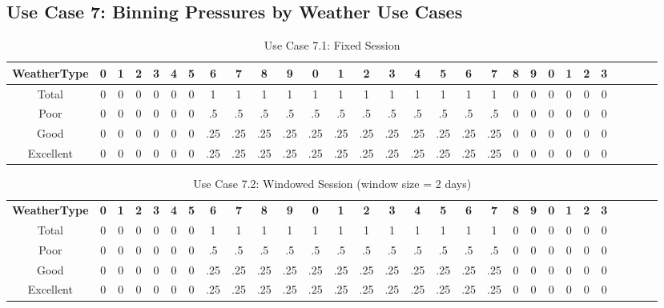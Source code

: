 \documentclass{article}
\begin{document}
\subsection{Use Case 7: Binning Pressures by Weather Use Cases}

\begin{table}
{\tiny
\caption{Use Case 7.1: Fixed Session\label{tab:time}}
\begin{tabular*}{1.05\textwidth}{@{\extracolsep{\fill}}ccccccccccccccccccccccccccccc}
\hline \hline
{\bf WeatherType} & {\bf 0} & {\bf 1} & {\bf 2} & {\bf 3} & {\bf 4} & {\bf 5} & {\bf 6} & {\bf 7} & {\bf 8} & {\bf 9} & {\bf 0} & {\bf 1} & {\bf 2} & {\bf 3} & {\bf 4} & {\bf 5} & {\bf 6} & {\bf 7} & {\bf 8} & {\bf 9} & {\bf 0} & {\bf 1} & {\bf 2} & {\bf 3}\\
\hline
Total & 0 & 0 & 0 & 0 & 0 & 0 & 1 & 1 & 1 & 1 & 1 & 1 & 1 & 1 & 1 & 1 & 1 & 1 & 0 & 0 & 0 & 0 & 0 & 0\\
Poor & 0 & 0 & 0 & 0 & 0 & 0 & .5 & .5 & .5 & .5 & .5 & .5 & .5 & .5 & .5 & .5 & .5 & .5 & 0 & 0 & 0 & 0 & 0 & 0\\
Good & 0 & 0 & 0 & 0 & 0 & 0 & .25 & .25 & .25 & .25 & .25 & .25 & .25 & .25 & .25 & .25 & .25 & .25 & 0 & 0 & 0 & 0 & 0 & 0\\
Excellent & 0 & 0 & 0 & 0 & 0 & 0 & .25 & .25 & .25 & .25 & .25 & .25 & .25 & .25 & .25 & .25 & .25 & .25 & 0 & 0 & 0 & 0 & 0 & 0\\
\hline \hline
\end{tabular*}
}
\end{table}


\begin{table}
{\tiny
\caption{Use Case 7.2: Windowed Session (window size = 2 days)\label{tab:time}}
\begin{tabular*}{1.05\textwidth}{@{\extracolsep{\fill}}ccccccccccccccccccccccccccccc}
\hline \hline
{\bf WeatherType} & {\bf 0} & {\bf 1} & {\bf 2} & {\bf 3} & {\bf 4} & {\bf 5} & {\bf 6} & {\bf 7} & {\bf 8} & {\bf 9} & {\bf 0} & {\bf 1} & {\bf 2} & {\bf 3} & {\bf 4} & {\bf 5} & {\bf 6} & {\bf 7} & {\bf 8} & {\bf 9} & {\bf 0} & {\bf 1} & {\bf 2} & {\bf 3}\\
Total & 0 & 0 & 0 & 0 & 0 & 0 & 1 & 1 & 1 & 1 & 1 & 1 & 1 & 1 & 1 & 1 & 1 & 1 & 0 & 0 & 0 & 0 & 0 & 0\\
Poor & 0 & 0 & 0 & 0 & 0 & 0 & .5 & .5 & .5 & .5 & .5 & .5 & .5 & .5 & .5 & .5 & .5 & .5 & 0 & 0 & 0 & 0 & 0 & 0\\
Good & 0 & 0 & 0 & 0 & 0 & 0 & .25 & .25 & .25 & .25 & .25 & .25 & .25 & .25 & .25 & .25 & .25 & .25 & 0 & 0 & 0 & 0 & 0 & 0\\
Excellent & 0 & 0 & 0 & 0 & 0 & 0 & .25 & .25 & .25 & .25 & .25 & .25 & .25 & .25 & .25 & .25 & .25 & .25 & 0 & 0 & 0 & 0 & 0 & 0\\

\hline
\hline \hline
\end{tabular*}
}
\end{table}
\end{document}
